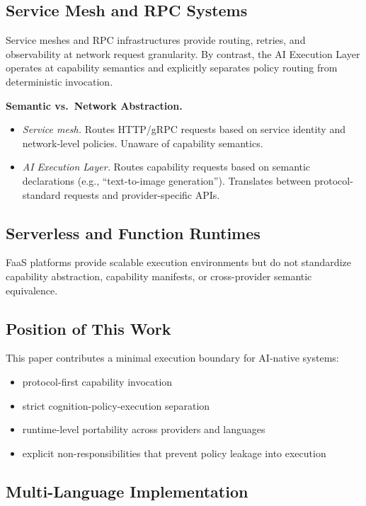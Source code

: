 \subsection{Service Mesh and RPC Systems}

Service meshes and RPC infrastructures provide routing, retries, and observability at network request granularity. By contrast, the AI Execution Layer operates at capability semantics and explicitly separates policy routing from deterministic invocation.

\textbf{Semantic vs.\ Network Abstraction.}
\begin{itemize}
    \item \emph{Service mesh.} Routes HTTP/gRPC requests based on service identity and network-level policies. Unaware of capability semantics.
    \item \emph{AI Execution Layer.} Routes capability requests based on semantic declarations (e.g., ``text-to-image generation''). Translates between protocol-standard requests and provider-specific APIs.
\end{itemize}

\subsection{Serverless and Function Runtimes}

FaaS platforms provide scalable execution environments but do not standardize capability abstraction, capability manifests, or cross-provider semantic equivalence.

\subsection{Position of This Work}

This paper contributes a minimal execution boundary for AI-native systems:
\begin{itemize}
    \item protocol-first capability invocation
    \item strict cognition-policy-execution separation
    \item runtime-level portability across providers and languages
    \item explicit non-responsibilities that prevent policy leakage into execution
\end{itemize}

\subsection{Multi-Language Implementation}

